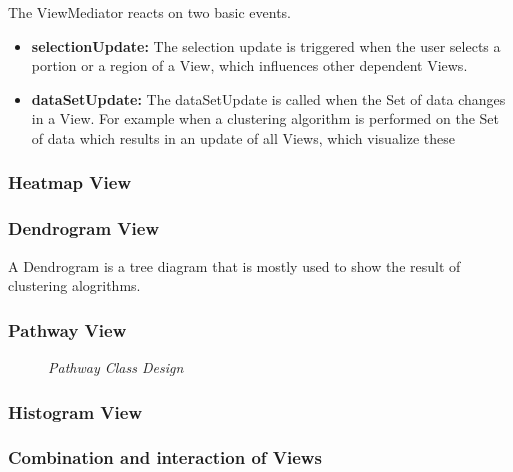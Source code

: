 The ViewMediator reacts on two basic events.
\begin{itemize}
\item \textbf{selectionUpdate: } The selection update is triggered when the user selects a portion or a region of a View, which influences other dependent Views.
\item \textbf{dataSetUpdate: } The dataSetUpdate is called when the Set of data changes in a View. For example when a clustering algorithm is performed on the Set of data which results in an update of all Views, which visualize these 
\end{itemize}

\subsubsection{Heatmap View}

\subsubsection{Dendrogram View}

A Dendrogram is a tree diagram that is mostly used to show the result of clustering alogrithms.

\subsubsection{Pathway View}

\begin{figure}[ht]
\centering
{} 
\caption[Pathway Class Design]{\textit{Pathway Class Design}} 
\label{gfx:pathway_class_design}
\end{figure}

\subsubsection{Histogram View}

\subsubsection{Combination and interaction of Views}




